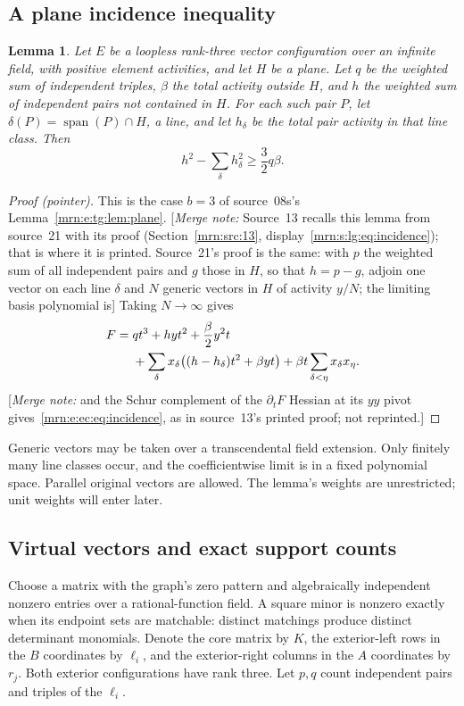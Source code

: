 \documentclass[11pt,a4paper]{article}
\newtheorem{lemma}[theorem]{Lemma}
\theoremstyle{remark}\newtheorem{remark}[theorem]{Remark}
\newcommand{\spn}{\operatorname{span}}     %
\newcommand{\mnote}[1]{[\textit{Merge note:} #1]}
\begin{document}
\subsection{A plane incidence inequality}
\begin{lemma}\label{mrn:e:ec:lem:incidence}
Let $E$ be a loopless rank-three vector configuration over an infinite field, with positive element activities, and let $H$ be a plane. Let $q$ be the weighted sum of independent triples, $\beta$ the total activity outside $H$, and $h$ the weighted sum of independent pairs not contained in $H$. For each such pair $P$, let
$\delta(P)=\spn(P)\cap H$, a line, and let $h_\delta$ be the total pair activity in that line class. Then
\begin{equation}\label{mrn:e:ec:eq:incidence}
 h^2-\sum_\delta h_\delta^2\ge\frac32q\beta.
\end{equation}
\end{lemma}
\begin{proof}[Proof (pointer)]
This is the case $b=3$ of source~08s's Lemma~\ref{mrn:e:tg:lem:plane}. \mnote{Source~13 recalls this lemma from source~21 with its proof (Section~\ref{mrn:src:13}, display~\eqref{mrn:s:lg:eq:incidence}); that is where it is printed. Source~21's proof is the same: with $p$ the weighted sum of all independent pairs and $g$ those in $H$, so that $h=p-g$, adjoin one vector on each line $\delta$ and $N$ generic vectors in $H$ of activity $y/N$; the limiting basis polynomial is} Taking $N\to\infty$ gives
\begin{align}
 F={}&qt^3+hyt^2+\frac{\beta}{2}y^2t \notag\\
 &+\sum_\delta x_\delta\bigl((h-h_\delta)t^2+\beta yt\bigr)
   +\beta t\sum_{\delta<\eta}x_\delta x_\eta. \label{mrn:e:ec:eq:plane}
\end{align}
\mnote{and the Schur complement of the $\partial_tF$ Hessian at its $yy$ pivot gives~\eqref{mrn:e:ec:eq:incidence}, as in source~13's printed proof; not reprinted.}
\end{proof}

Generic vectors may be taken over a transcendental field extension. Only finitely many line classes occur, and the coefficientwise limit is in a fixed polynomial space. Parallel original vectors are allowed. The lemma's weights are unrestricted; unit weights will enter later.

\subsection{Virtual vectors and exact support counts}
Choose a matrix with the graph's zero pattern and algebraically independent nonzero entries over a rational-function field. A square minor is nonzero exactly when its endpoint sets are matchable: distinct matchings produce distinct determinant monomials. Denote the core matrix by $K$, the exterior-left rows in the $B$ coordinates by $\ell_i$, and the exterior-right columns in the $A$ coordinates by $r_j$. Both exterior configurations have rank three. Let $p,q$ count independent pairs and triples of the $\ell_i$.
\end{document}
